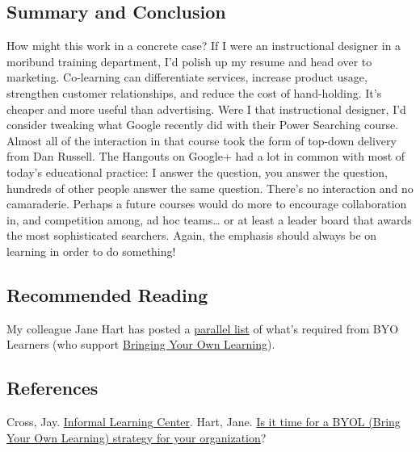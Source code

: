 \subsection{Summary and Conclusion}

How might this work in a concrete case? If I were an instructional
designer in a moribund training department, I'd polish up my resume and
head over to marketing. Co-learning can differentiate services, increase
product usage, strengthen customer relationships, and reduce the cost of
hand-holding. It's cheaper and more useful than advertising. Were I that
instructional designer, I'd consider tweaking what Google recently did
with their Power Searching course. Almost all of the interaction in that
course took the form of top-down delivery from Dan Russell. The Hangouts
on Google+ had a lot in common with most of today's educational
practice: I answer the question, you answer the question, hundreds of
other people answer the same question. There's no interaction and no
camaraderie. Perhaps a future courses would do more to encourage
collaboration in, and competition among, ad hoc teams\ldots{} or at
least a leader board that awards the most sophisticated searchers.
Again, the emphasis should always be on learning in order to do
something!

\subsection{Recommended Reading}

My colleague Jane Hart has posted a
\href{http://www.c4lpt.co.uk/blog/2012/04/20/is-it-time-for-a-byol-bring-your-own-learning-strategy-in-your-organization-byol/}{parallel
list} of what's required from BYO Learners (who support
\href{http://www.c4lpt.co.uk/blog/2012/04/20/is-it-time-for-a-byol-bring-your-own-learning-strategy-in-your-organization-byol/}{Bringing
Your Own Learning}).

\subsection{References}

Cross, Jay.
\href{http://www.jaycross.com/wp/?portfolio=informal-learning}{Informal
Learning Center}. Hart, Jane.
\href{http://www.c4lpt.co.uk/blog/2012/04/20/is-it-time-for-a-byol-bring-your-own-learning-strategy-in-your-organization-byol/}{Is
it time for a BYOL (Bring Your Own Learning) strategy for your
organization}?
